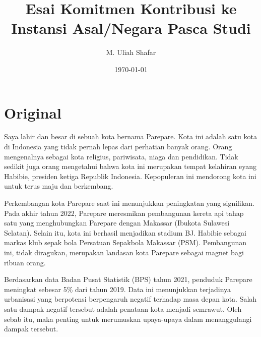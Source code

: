 \documentclass[../main.tex]{subfiles}
\title{
	\textbf{Esai Komitmen Kontribusi ke Instansi Asal/Negara Pasca Studi}\\} %
\date{\today}
\author{M. Uliah Shafar}
\begin{document}
\maketitle
\section{Original}

Saya lahir dan besar di sebuah kota  bernama Parepare.
Kota ini adalah satu kota di Indonesia yang tidak pernah lepas dari perhatian banyak orang.
Orang mengenalnya sebagai kota religius, pariwisata, niaga dan pendidikan.
Tidak sedikit juga orang mengetahui bahwa kota ini merupakan tempat kelahiran eyang Habibie, presiden ketiga Republik Indonesia.
Kepopuleran ini mendorong kota ini untuk terus maju dan berkembang.

Perkembangan kota Parepare saat ini menunjukkan peningkatan yang signifikan.
Pada akhir tahun 2022, Parepare meresmikan pembangunan kereta api tahap satu yang menghubungkan Parepare dengan Makassar (Ibukota Sulawesi Selatan).
Selain itu, kota ini berhasil menjadikan stadium BJ. Habibie sebagai markas klub sepak bola Persatuan Sepakbola Makassar (PSM).
Pembangunan ini, tidak diragukan, merupakan landasan kota Parepare sebagai magnet bagi ribuan orang.


Berdasarkan data Badan Pusat Statistik (BPS) tahun 2021, penduduk Parepare meningkat sebesar 5\% dari tahun 2019.
Data ini menunjukkan terjadinya urbanisasi yang berpotensi berpengaruh negatif terhadap masa depan kota. Salah satu dampak negatif tersebut adalah penataan kota menjadi semrawut.
Oleh sebab itu, maka penting untuk merumuskan upaya-upaya dalam menanggulangi dampak tersebut.



\end{document}
